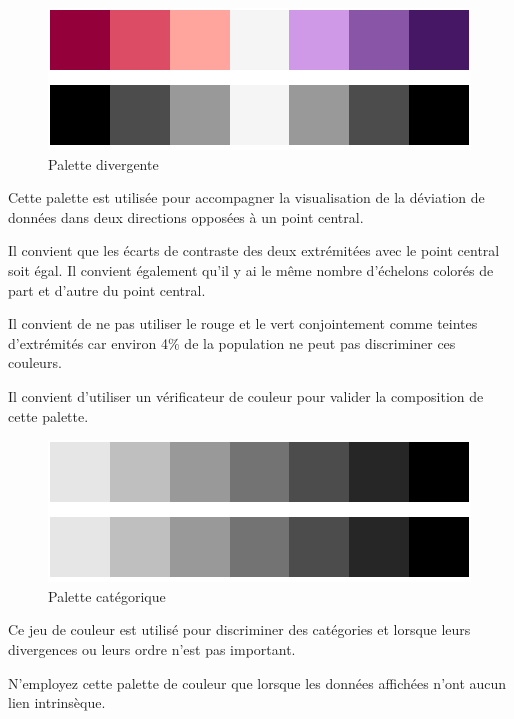 \documentclass[a4paper,12pt]{article}
\begin{document}
\begin{multicols}{2}
\begin{figure}[H]
\centering
\includegraphics[width=.9\linewidth]{./img/palette-divergente.pdf}
\caption{\label{fig:orga340580}Palette divergente}
\end{figure}

Cette palette est utilisée pour accompagner la visualisation de la déviation de données dans deux directions opposées à un point central. \autocite{wilkeColorScales2019}

Il convient que les écarts de contraste des deux extrémitées avec le point central soit égal. Il convient également qu'il y ai le même nombre d'échelons colorés de part et d'autre du point central. \autocite{wilkeColorScales2019}

Il convient de ne pas utiliser le rouge et le vert conjointement comme teintes d'extrémités car environ 4\% de la population ne peut pas discriminer ces couleurs. \autocite{schwabishCenteringAccessibilityData2022a}

Il convient d'utiliser un vérificateur de couleur pour valider la composition de cette palette.\autocite{andreaskrauseBestPracticesData2024}

\begin{figure}[H]
\centering
\includegraphics[width=.9\linewidth]{./img/palette-categorique.pdf}
\caption{\label{fig:org9f2c49e}Palette catégorique}
\end{figure}

Ce jeu de couleur est utilisé pour discriminer des catégories et lorsque leurs divergences ou leurs ordre n'est pas important.\autocite{andreaskrauseBestPracticesData2024}

N'employez cette palette de couleur que lorsque les données affichées n'ont aucun lien intrinsèque. \autocite{wilkeColorScales2019}


\end{multicols}
\end{document}
